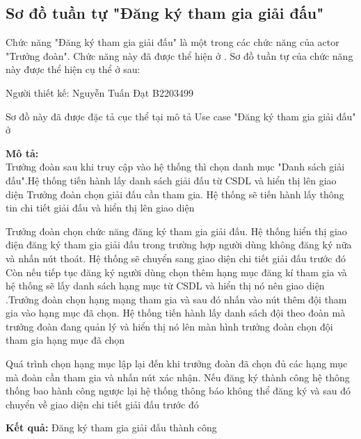 \subsection{Sơ đồ tuần tự "Đăng ký tham gia giải đấu"}
\setcounter{figure}{0}

Chức năng "Đăng ký tham gia giải đấu" là một trong các chức năng của actor "Trưởng đoàn".
Chức năng này đã được thể hiện ở .
Sơ đồ tuần tự của chức năng này được thể hiện cụ thể ở \myref{} sau:

Người thiết kế: Nguyễn Tuấn Đạt B2203499

Sơ đồ này đã được đặc tả cục thể tại mô tả Use case
"Đăng ký tham gia giải đấu" ở 

\noindent
\textbf{Mô tả:}\\
Trưởng đoàn sau khi truy cập vào hệ thống thì chọn danh mục "Danh sách giải đấu".Hệ thống tiến hành lấy danh sách giải đấu từ CSDL và hiển thị lên giao diện Trưởng đoàn chọn giải đấu cần tham gia. Hệ thống sẽ tiến hành lấy thông tin chi tiết giải đấu và hiển thị lên giao diện \par
Trưởng đoàn chọn chức năng đăng ký tham gia giải đấu. Hệ thống hiển thị giao điện đăng ký tham gia giải đấu trong trường hợp người dùng không đăng ký nữa và nhấn nút thoát. Hệ thống sẽ chuyển sang giao diện chi tiết giải đấu trước đó Còn nếu tiếp tục đăng ký người dùng chọn thêm hạng mục đăng kí tham gia và hệ thống sẽ lấy danh sách hạng mục từ CSDL và hiển thị nó nên giao diện .Trưởng đoàn chọn hạng mạng tham gia và sau đó nhấn vào nút thêm đội tham gia vào hạng mục đã chọn. Hệ thống tiến hành lấy danh sách đội theo đoàn mà trưởng đoàn đang quản lý và hiển thị nó lên màn hình trưởng đoàn chọn đội tham gia hạng mục đã chọn \par
Quá trình chọn hạng mục lập lại đến khi trưởng đoàn đã chọn đủ các hạng mục mà đoàn cần tham gia và nhấn nút xác nhận. Nếu đăng ký thành công hệ thông thống bao hành công ngược lại hệ thống thông báo không thể đăng ký và sau đó chuyển về giao diện chi tiết giải đấu trước đó

\noindent
\textbf{Kết quả:} Đăng ký tham gia giải đấu thành công


